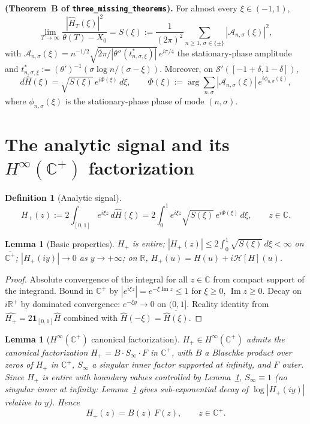 \documentclass[11pt]{article}
\newtheorem{lemma}[theorem]{Lemma}
\theoremstyle{definition}
\newtheorem{definition}[theorem]{Definition}
\newcommand{\R}{\mathbb{R}}
\newcommand{\C}{\mathbb{C}}
\newcommand{\Cpls}{\C^+}
\newcommand{\Sprime}{\mathcal{S}'}
\DeclareMathOperator{\Imag}{Im}
\begin{document}
\textbf{(Theorem~B of \texttt{three\_missing\_theorems}).} For almost every $\xi \in (-1, 1)$,
\begin{equation}\label{eq:B1}
\lim_{T \to \infty}\frac{|\widehat H_T(\xi)|^2}{\theta(T) - X_0} = S(\xi) := \frac{1}{(2\pi)^2}\sum_{n \geq 1,\, \sigma \in \{\pm\}}|\mathcal A_{n,\sigma}(\xi)|^2,
\end{equation}
with $\mathcal A_{n,\sigma}(\xi) = n^{-1/2}\sqrt{2\pi/|\theta''(t^*_{n,\sigma,\xi})|}\,e^{i\pi/4}$ the stationary-phase amplitude and $t^*_{n,\sigma,\xi} := (\theta')^{-1}(\sigma\log n/(\sigma - \xi))$. Moreover, on $\Sprime([-1+\delta, 1-\delta])$,
\begin{equation}\label{eq:B4}
d\widehat H(\xi) = \sqrt{S(\xi)}\,e^{i\Phi(\xi)}\,d\xi, \qquad \Phi(\xi) := \arg\!\sum_{n,\sigma}|\mathcal A_{n,\sigma}(\xi)|\,e^{i\phi_{n,\sigma}(\xi)},
\end{equation}
where $\phi_{n,\sigma}(\xi)$ is the stationary-phase phase of mode $(n, \sigma)$.

\section{The analytic signal and its $H^\infty(\Cpls)$ factorization}

\begin{definition}[Analytic signal]
\[
H_+(z) := 2\int_{[0,1]} e^{i\xi z}\, d\widehat H(\xi) = 2\int_0^1 e^{i\xi z}\sqrt{S(\xi)}\,e^{i\Phi(\xi)}\,d\xi, \qquad z \in \C.
\]
\end{definition}

\begin{lemma}[Basic properties]\label{lem:basic}
$H_+$ is entire; $|H_+(z)| \leq 2\int_0^1 \sqrt{S(\xi)}\, d\xi < \infty$ on $\overline{\Cpls}$; $|H_+(iy)| \to 0$ as $y \to +\infty$; on $\R$, $H_+(u) = H(u) + i\mathcal H[H](u)$.
\end{lemma}

\begin{proof}
Absolute convergence of the integral for all $z \in \C$ from compact support of the integrand. Bound in $\Cpls$ by $|e^{i\xi z}| = e^{-\xi \Imag z} \leq 1$ for $\xi \geq 0$, $\Imag z \geq 0$. Decay on $i\R^+$ by dominated convergence: $e^{-\xi y} \to 0$ on $(0, 1]$. Reality identity from $\widehat{H_+} = 2\mathbf 1_{[0,1]}\widehat H$ combined with $\widehat{H}(-\xi) = \overline{\widehat H(\xi)}$.
\end{proof}

\begin{lemma}[$H^\infty(\Cpls)$ canonical factorization]\label{lem:canonical}
$H_+ \in H^\infty(\Cpls)$ admits the canonical factorization $H_+ = B \cdot S_\infty \cdot F$ in $\Cpls$, with $B$ a Blaschke product over zeros of $H_+$ in $\Cpls$, $S_\infty$ a singular inner factor supported at infinity, and $F$ outer. Since $H_+$ is entire with boundary values controlled by Lemma~\ref{lem:basic}, $S_\infty \equiv 1$ (no singular inner at infinity: Lemma~\ref{lem:basic} gives sub-exponential decay of $\log|H_+(iy)|$ relative to $y$). Hence
\[
H_+(z) = B(z)\, F(z), \qquad z \in \Cpls.
\]
\end{lemma}
\end{document}
